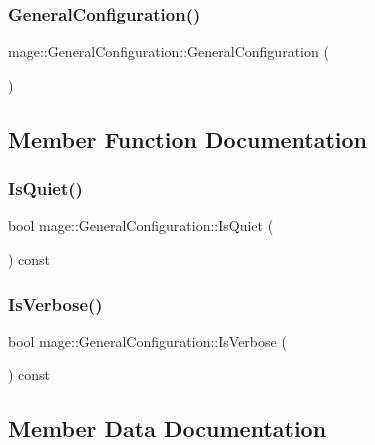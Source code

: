 \subsubsection{\texorpdfstring{General\+Configuration()}{GeneralConfiguration()}}
{\footnotesize\ttfamily mage\+::\+General\+Configuration\+::\+General\+Configuration (\begin{DoxyParamCaption}{ }\end{DoxyParamCaption})}



\subsection{Member Function Documentation}
\hypertarget{structmage_1_1_general_configuration_a51e37e3d7473c16fa90efa7501f54ebc}{}\label{structmage_1_1_general_configuration_a51e37e3d7473c16fa90efa7501f54ebc} 
\subsubsection{\texorpdfstring{Is\+Quiet()}{IsQuiet()}}
{\footnotesize\ttfamily bool mage\+::\+General\+Configuration\+::\+Is\+Quiet (\begin{DoxyParamCaption}{ }\end{DoxyParamCaption}) const}

\hypertarget{structmage_1_1_general_configuration_affb1e42d744f4f75d244dc63278a4e94}{}\label{structmage_1_1_general_configuration_affb1e42d744f4f75d244dc63278a4e94} 
\subsubsection{\texorpdfstring{Is\+Verbose()}{IsVerbose()}}
{\footnotesize\ttfamily bool mage\+::\+General\+Configuration\+::\+Is\+Verbose (\begin{DoxyParamCaption}{ }\end{DoxyParamCaption}) const}



\subsection{Member Data Documentation}
\hypertarget{structmage_1_1_general_configuration_aaa638cb4be1dfc8d3af3fddfb7933773}{}\label{structmage_1_1_general_configuration_aaa638cb4be1dfc8d3af3fddfb7933773} 
